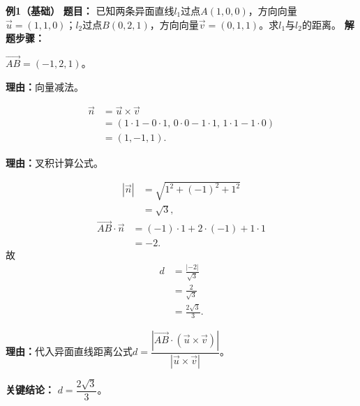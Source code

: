 \begin{examplebox}
	\textbf{\textcolor{CExample}{例1（基础）}}
	\textbf{\textcolor{CExample}{题目：}}
	已知两条异面直线$l_1$过点$A(1,0,0)$，方向向量$\vec{u}=(1,1,0)$；$l_2$过点$B(0,2,1)$，方向向量$\vec{v}=(0,1,1)$。求$l_1$与$l_2$的距离。
	\textbf{\textcolor{CExample}{解题步骤：}}
	\begin{description}[style=nextline, leftmargin=2.8em, labelsep=0.5em, itemsep=0.45em]
		\item[\textbf{第一步（求连接向量）：}]
			$\overrightarrow{AB}=(-1,2,1)$。
			\par\textbf{理由：}向量减法。
		\item[\textbf{第二步（求叉积）：}]
			\[
				\begin{aligned}
					\vec{n} &= \vec{u}\times\vec{v} \\ &= (1\cdot1-0\cdot1,\,0\cdot0-1\cdot1,\,1\cdot1-1\cdot0) \\ &= (1,-1,1).
			\end{aligned}
			\]
			\par\textbf{理由：}叉积计算公式。
		\item[\textbf{第三步（代公式计算）：}]
			\[
				\begin{aligned}
					|\vec{n}| &= \sqrt{1^2+(-1)^2+1^2} \\ &= \sqrt{3},
			\end{aligned}
			\]
			\[
				\begin{aligned}
					\overrightarrow{AB}\cdot\vec{n} &= (-1)\cdot1+2\cdot(-1)+1\cdot1 \\ &= -2.
			\end{aligned}
			\]
			故
			\[
				\begin{aligned}
					d &= \frac{|-2|}{\sqrt{3}} \\ &= \frac{2}{\sqrt{3}} \\ &= \frac{2\sqrt{3}}{3}.
			\end{aligned}
			\]
			\par\textbf{理由：}代入异面直线距离公式$d=\dfrac{|\overrightarrow{AB}\cdot(\vec{u}\times\vec{v})|}{|\vec{u}\times\vec{v}|}$。
	\end{description}
	\textbf{\textcolor{CExample}{关键结论：}}
	\textbf{$d=\dfrac{2\sqrt{3}}{3}$}。


\end{examplebox}
